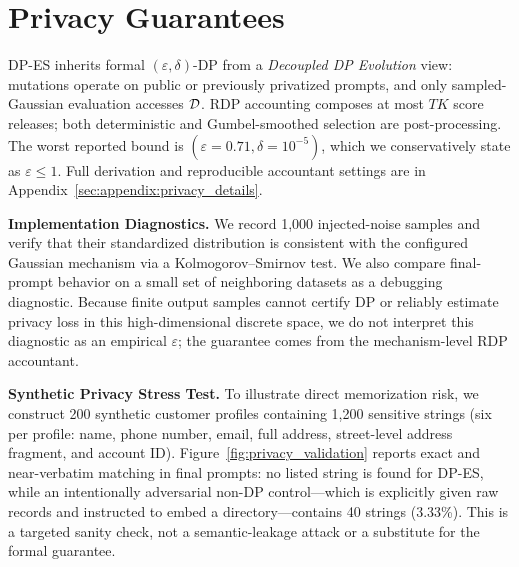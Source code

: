 \section{Privacy Guarantees}
\label{sec:privacy_analysis}

DP-ES inherits formal $(\varepsilon,\delta)$-DP from a \textit{Decoupled DP Evolution} view: mutations operate on public or previously privatized prompts, and only sampled-Gaussian evaluation accesses $\mathcal{D}$. RDP accounting composes at most $TK$ score releases; both deterministic and Gumbel-smoothed selection are post-processing. The worst reported bound is $(\varepsilon{=}0.71,\delta{=}10^{-5})$, which we conservatively state as $\varepsilon\leq1$. Full derivation and reproducible accountant settings are in Appendix~\ref{sec:appendix:privacy_details}.

\noindent\textbf{Implementation Diagnostics.}
We record 1,000 injected-noise samples and verify that their standardized distribution is consistent with the configured Gaussian mechanism via a Kolmogorov--Smirnov test. We also compare final-prompt behavior on a small set of neighboring datasets as a debugging diagnostic. Because finite output samples cannot certify DP or reliably estimate privacy loss in this high-dimensional discrete space, we do not interpret this diagnostic as an empirical $\varepsilon$; the guarantee comes from the mechanism-level RDP accountant.

\noindent\textbf{Synthetic Privacy Stress Test.}
To illustrate direct memorization risk, we construct 200 synthetic customer profiles containing 1,200 sensitive strings (six per profile: name, phone number, email, full address, street-level address fragment, and account ID). Figure~\ref{fig:privacy_validation} reports exact and near-verbatim matching in final prompts: no listed string is found for DP-ES, while an intentionally adversarial non-DP control---which is explicitly given raw records and instructed to embed a directory---contains 40 strings (3.33\%). This is a targeted sanity check, not a semantic-leakage attack or a substitute for the formal guarantee.


